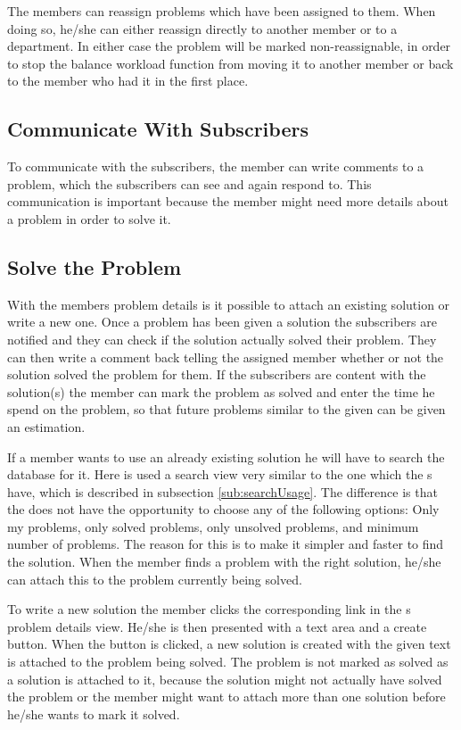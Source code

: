 The \astaff[] members can reassign problems which have been assigned to them.
When doing so, he/she can either reassign directly to another \astaff[] member or to a department.
In either case the problem will be marked non-reassignable, in order to stop the balance workload function from moving it to another \astaff[] member or back to the \astaff[] member who had it in the first place.

\subsection{Communicate With Subscribers}
\label{sub:communicate}
To communicate with the subscribers, the \astaff[] member can write comments to a problem, which the subscribers can see and again respond to.
This communication is important because the \astaff[] member might need more details about a problem in order to solve it.

\subsection{Solve the Problem}
\label{sub:solveprob}
With the \staff[] members problem details is it possible to attach an existing solution or write a new one.
Once a problem has been given a solution the subscribers are notified and they can check if the solution actually solved their problem.
They can then write a comment back telling the assigned \astaff[] member whether or not the solution solved the problem for them.
If the subscribers are content with the solution(s) the \astaff[] member can mark the problem as solved and enter the time he spend on the problem, so that future problems similar to the given can be given an estimation.

If a \astaff[] member wants to use an already existing solution he will have to search the database for it.
Here is used a search view very similar to the one which the \aclient[]s have, which is described in subsection \ref{sub:searchUsage}.
The difference is that the \astaff[] does not have the opportunity to choose any of the following options: Only my problems, only solved problems, only unsolved problems, and minimum number of problems.
The reason for this is to make it simpler and faster to find the solution.
When the \astaff[] member finds a problem with the right solution, he/she can attach this to the problem currently being solved.

To write a new solution the \astaff[] member clicks the corresponding link in the \astaff[]s problem details view.
He/she is then presented with a text area and a create button.
When the button is clicked, a new solution is created with the given text is attached to the problem being solved.
The problem is not marked as solved as a solution is attached to it, because the solution might not actually have solved the problem or the \astaff[] member might want to attach more than one solution before he/she wants to mark it solved.
